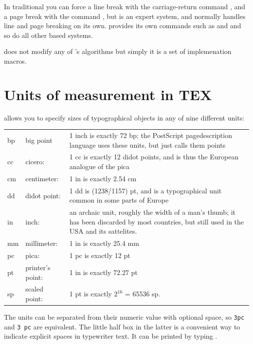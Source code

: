 In traditional \tex you  can force a line break with the carriage-return command ,
and a page break with the command , but \tex is an expert system,
and normally handles line and page breaking on its own. \latex provides its own commands such as  and  and so do all other \tex based systems.

\latex does not modify any of \tex's algorithms but simply it is a set of implemenation
macros.

\section{Units of measurement in TEX}

\tex allows you to specify sizes of typographical objects in any of nine different
units:


\begin{table}[htbp]
\begin{center}
\begin{tabular}{llp{5cm}}
\toprule
bp &big point &1 inch is exactly 72 bp; the PostScript pagedescription language uses these units, but just calls them points\\
cc &cicero: &1 cc is exactly 12 didot points, and is thus the European  analogue of the pica\\
cm &centimeter: &1 in is exactly 2.54 cm\\
dd &didot point: &1 dd is (1238/1157) pt, and is a typographical unit common in some parts of Europe\\
in &inch: &an archaic unit, roughly the width of a man's thumb; it has been discarded by most countries, but still used in the USA and its sattelites.\\
mm &millimeter: &1 in is exactly 25.4 mm\\
pc &pica: &1 pc is exactly 12 pt\\
pt &printer's point: &1 in is exactly 72.27 pt\\ 
sp &scaled point: &1 pt is exactly $2^{16}$ = 65536 sp.\\
\bottomrule
\end{tabular}
\end{center}
\end{table}



The units can be separated from their numeric value with optional space, so
\texttt{3pc} and \verb*+3 pc+ are equivalent. The little half box in the latter is a convenient
way to indicate explicit spaces in typewriter text. It can be printed by typing .

